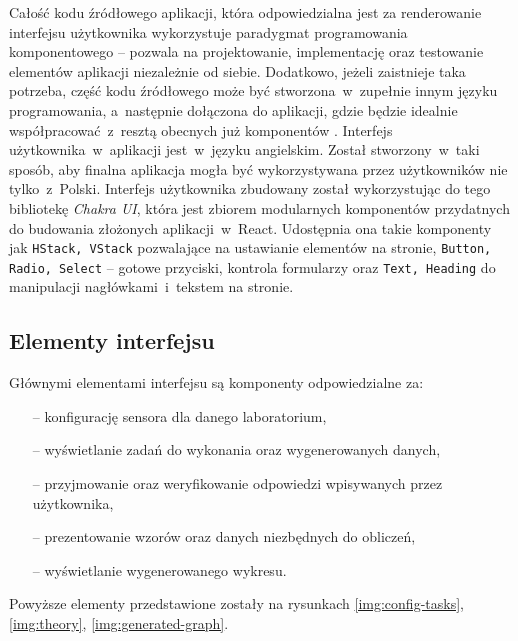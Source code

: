 Całość kodu źródłowego aplikacji, która odpowiedzialna jest za renderowanie interfejsu użytkownika
wykorzystuje paradygmat programowania komponentowego -- pozwala na projektowanie, implementację oraz
testowanie elementów aplikacji niezależnie od siebie. Dodatkowo, jeżeli zaistnieje taka potrzeba,
część kodu źródłowego może być stworzona~w~zupełnie innym języku programowania, a~następnie
dołączona do aplikacji, gdzie będzie idealnie współpracować~z~resztą obecnych już komponentów
\cite{component-programming}. Interfejs użytkownika~w~aplikacji jest~w~języku angielskim. Został
stworzony~w~taki sposób, aby finalna aplikacja mogła być wykorzystywana przez użytkowników nie
tylko~z~Polski. Interfejs użytkownika zbudowany został wykorzystując do tego bibliotekę
\textit{Chakra UI}, która jest zbiorem modularnych komponentów przydatnych do budowania złożonych
aplikacji~w~React. Udostępnia ona takie komponenty jak \texttt{HStack, VStack} pozwalające na
ustawianie elementów na stronie, \texttt{Button, Radio, Select} -- gotowe przyciski, kontrola
formularzy oraz \texttt{Text, Heading} do manipulacji nagłówkami~i~tekstem na stronie.

\subsection{Elementy interfejsu}
Głównymi elementami interfejsu są komponenty odpowiedzialne za:
\begin{itemize}
  \item[--] konfigurację sensora dla danego laboratorium,
  \item[--] wyświetlanie zadań do wykonania oraz wygenerowanych danych,
  \item[--] przyjmowanie oraz weryfikowanie odpowiedzi wpisywanych przez użytkownika,
  \item[--] prezentowanie wzorów oraz danych niezbędnych do obliczeń,
  \item[--] wyświetlanie wygenerowanego wykresu.
\end{itemize}
Powyższe elementy przedstawione zostały na rysunkach \ref{img:config-tasks}, \ref{img:theory},
\ref{img:generated-graph}.

\begingroup
{}


